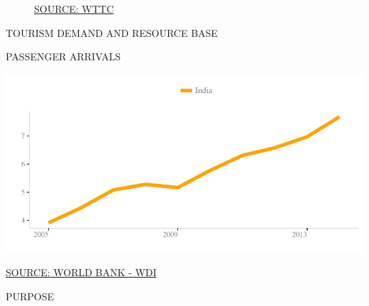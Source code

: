 \documentclass{article}\usepackage[]{graphicx}\usepackage[]{color}
\makeatletter
\def\maxwidth{ %
  \ifdim\Gin@nat@width>\linewidth
    \linewidth
  \else
    \Gin@nat@width
  \fi
}
\makeatother
\begin{document}
\begin{figure}
\begin{minipage}[t]{0.99\textwidth}
\begin{minipage}[t]{0.56\textwidth}
\begin{minipage}[c]{0.30\textwidth}
{}



    \vspace{-2ex}
    \hspace{2ex}\tiny{\href{https://tool.wttc.org/}{\textcolor[HTML]{FF4023}{SOURCE: WTTC}}}
    \end{minipage}
  \end{minipage}
\end{minipage}
\end{figure}

\begin{minipage}[t]{0.95\textwidth}
  \begin{flushleft}  
    \hspace{4ex}\Large{\textcolor[HTML]{FF4023}{TOURISM DEMAND AND RESOURCE BASE}}\hspace{2ex}\small{\textcolor[HTML]{818181}{}}
  \end{flushleft}
  \begin{minipage}[b]{0.5\textwidth}
      \hspace{4ex}\small{\textcolor[HTML]{818181}{PASSENGER ARRIVALS}}
      \vspace{1ex}


\hfill{}\includegraphics[width=\maxwidth]{figure/line1_1-1} 



     \hspace{4ex}\scriptsize{\href{NA}{\textcolor[HTML]{FF4023}{SOURCE: WORLD BANK - WDI}}}
  \end{minipage}
  \begin{minipage}[b]{0.5\textwidth}  
      \hspace{4ex}\small{\textcolor[HTML]{818181}{PURPOSE}}
      \vspace{1ex}



\end{minipage}
\end{minipage}
\end{document}
